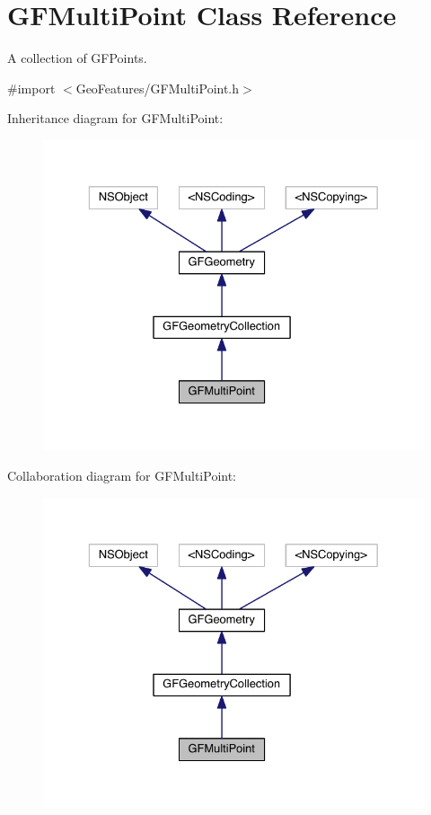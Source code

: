 \hypertarget{interface_g_f_multi_point}{}\section{G\+F\+Multi\+Point Class Reference}
\label{interface_g_f_multi_point}


A collection of G\+F\+Points.  




{\ttfamily \#import $<$Geo\+Features/\+G\+F\+Multi\+Point.\+h$>$}



Inheritance diagram for G\+F\+Multi\+Point\+:\nopagebreak
\begin{figure}[H]
\begin{center}
\leavevmode
\includegraphics[width=329pt]{interface_g_f_multi_point__inherit__graph}
\end{center}
\end{figure}


Collaboration diagram for G\+F\+Multi\+Point\+:\nopagebreak
\begin{figure}[H]
\begin{center}
\leavevmode
\includegraphics[width=329pt]{interface_g_f_multi_point__coll__graph}
\end{center}
\end{figure}
